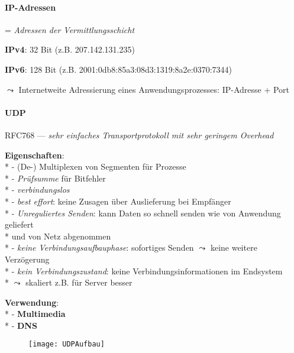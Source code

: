 \paragraph{IP-Adressen}
\begin{items}
  \item = \emph{Adressen der Vermittlungsschicht}
  \item \textbf{IPv4}: 32 Bit (z.B. 207.142.131.235)
  \item \textbf{IPv6}: 128 Bit (z.B. 2001:0db8:85a3:08d3:1319:8a2e:0370:7344)
  \item \( \leadsto \) Internetweite Adressierung eines Anwendungsprozesses: IP-Adresse + Port
\end{items}

\newpage

\paragraph{UDP}
\begin{items}
  \item RFC768 --- \emph{sehr einfaches Transportprotokoll mit sehr geringem Overhead}
  \item \textbf{Eigenschaften}: \\*
    - (De-) Multiplexen von Segmenten für Prozesse \\*
    - \emph{Prüfsumme} für Bitfehler \\*
    - \emph{verbindungslos} \\*
    - \emph{best effort}: keine Zusagen über Auslieferung bei Empfänger \\*
    - \emph{Unreguliertes Senden}: kann Daten so schnell senden wie von Anwendung geliefert \\* \phantom{-} und von Netz abgenommen \\*
    - \emph{keine Verbindungsaufbauphase}: sofortiges Senden \( \leadsto \) keine weitere Verzögerung \\*
    - \emph{kein Verbindungszustand}: keine Verbindungsinformationen im Endsystem \\* \phantom{-} \( \leadsto \) skaliert z.B. für Server besser
  \item \textbf{Verwendung}: \\*
    - \textbf{Multimedia} \\*
    - \textbf{DNS}
\end{items}
\begin{figure}[H]\centering\label{UDPAufbau}\texttt{[image: UDPAufbau]}\end{figure}

